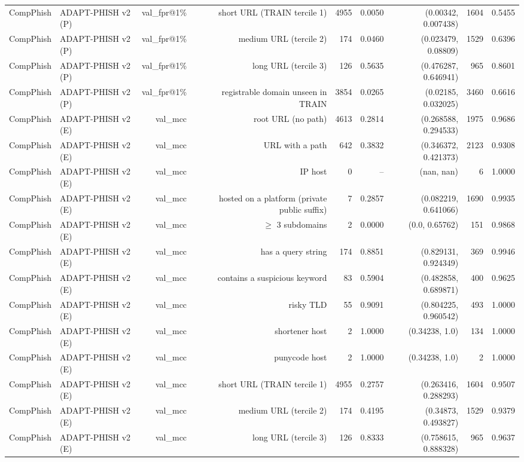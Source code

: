 \begin{table}[t]
\begin{tabular}{llrrrrrrr}
CompPhish & ADAPT-PHISH v2 (P) & val\_fpr@1\% & short URL (TRAIN tercile 1) & 4955 & 0.0050 & (0.00342, 0.007438) & 1604 & 0.5455 \\
CompPhish & ADAPT-PHISH v2 (P) & val\_fpr@1\% & medium URL (tercile 2) & 174 & 0.0460 & (0.023479, 0.08809) & 1529 & 0.6396 \\
CompPhish & ADAPT-PHISH v2 (P) & val\_fpr@1\% & long URL (tercile 3) & 126 & 0.5635 & (0.476287, 0.646941) & 965 & 0.8601 \\
CompPhish & ADAPT-PHISH v2 (P) & val\_fpr@1\% & registrable domain unseen in TRAIN & 3854 & 0.0265 & (0.02185, 0.032025) & 3460 & 0.6616 \\
CompPhish & ADAPT-PHISH v2 (E) & val\_mcc & root URL (no path) & 4613 & 0.2814 & (0.268588, 0.294533) & 1975 & 0.9686 \\
CompPhish & ADAPT-PHISH v2 (E) & val\_mcc & URL with a path & 642 & 0.3832 & (0.346372, 0.421373) & 2123 & 0.9308 \\
CompPhish & ADAPT-PHISH v2 (E) & val\_mcc & IP host & 0 & -- & (nan, nan) & 6 & 1.0000 \\
CompPhish & ADAPT-PHISH v2 (E) & val\_mcc & hosted on a platform (private public suffix) & 7 & 0.2857 & (0.082219, 0.641066) & 1690 & 0.9935 \\
CompPhish & ADAPT-PHISH v2 (E) & val\_mcc & $\geq$ 3 subdomains & 2 & 0.0000 & (0.0, 0.65762) & 151 & 0.9868 \\
CompPhish & ADAPT-PHISH v2 (E) & val\_mcc & has a query string & 174 & 0.8851 & (0.829131, 0.924349) & 369 & 0.9946 \\
CompPhish & ADAPT-PHISH v2 (E) & val\_mcc & contains a suspicious keyword & 83 & 0.5904 & (0.482858, 0.689871) & 400 & 0.9625 \\
CompPhish & ADAPT-PHISH v2 (E) & val\_mcc & risky TLD & 55 & 0.9091 & (0.804225, 0.960542) & 493 & 1.0000 \\
CompPhish & ADAPT-PHISH v2 (E) & val\_mcc & shortener host & 2 & 1.0000 & (0.34238, 1.0) & 134 & 1.0000 \\
CompPhish & ADAPT-PHISH v2 (E) & val\_mcc & punycode host & 2 & 1.0000 & (0.34238, 1.0) & 2 & 1.0000 \\
CompPhish & ADAPT-PHISH v2 (E) & val\_mcc & short URL (TRAIN tercile 1) & 4955 & 0.2757 & (0.263416, 0.288293) & 1604 & 0.9507 \\
CompPhish & ADAPT-PHISH v2 (E) & val\_mcc & medium URL (tercile 2) & 174 & 0.4195 & (0.34873, 0.493827) & 1529 & 0.9379 \\
CompPhish & ADAPT-PHISH v2 (E) & val\_mcc & long URL (tercile 3) & 126 & 0.8333 & (0.758615, 0.888328) & 965 & 0.9637 \\

\end{tabular}
\end{table}
